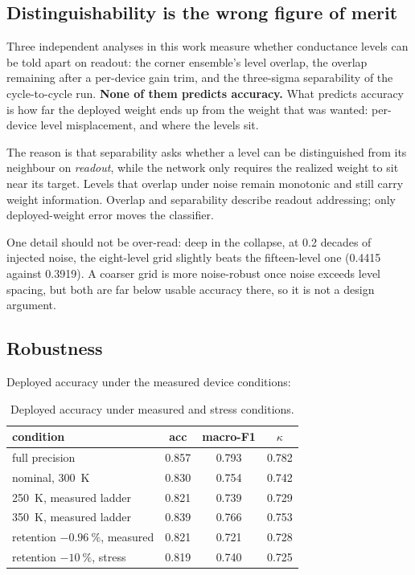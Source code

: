\subsection{Distinguishability is the wrong figure of merit}

Three independent analyses in this work measure whether conductance levels can be told
apart on readout: the corner ensemble's level overlap, the overlap remaining after a
per-device gain trim, and the three-sigma separability of the cycle-to-cycle run.
\textbf{None of them predicts accuracy.} What predicts accuracy is how far the deployed
weight ends up from the weight that was wanted: per-device level misplacement, and where
the levels sit.

The reason is that separability asks whether a level can be distinguished from its
neighbour on \emph{readout}, while the network only requires the realized weight to sit
near its target. Levels that overlap under noise remain monotonic and still carry weight
information. Overlap and separability describe readout addressing; only deployed-weight
error moves the classifier.

One detail should not be over-read: deep in the collapse, at \num{0.2} decades of injected
noise, the eight-level grid slightly beats the fifteen-level one (\num{0.4415} against
\num{0.3919}). A coarser grid is more noise-robust once noise exceeds level spacing, but
both are far below usable accuracy there, so it is not a design argument.

\subsection{Robustness}

Deployed accuracy under the measured device conditions:

\begin{table}[t]
\caption{Deployed accuracy under measured and stress conditions.}
\label{tab:robust}
\centering
\begin{tabular}{@{}lccc@{}}
\toprule
condition & acc & macro-F1 & $\kappa$ \\
\midrule
full precision & 0.857 & 0.793 & 0.782 \\
nominal, \SI{300}{\kelvin} & 0.830 & 0.754 & 0.742 \\
\SI{250}{\kelvin}, measured ladder & 0.821 & 0.739 & 0.729 \\
\SI{350}{\kelvin}, measured ladder & 0.839 & 0.766 & 0.753 \\
retention $-\SI{0.96}{\percent}$, measured & 0.821 & 0.721 & 0.728 \\
retention $-\SI{10}{\percent}$, stress & 0.819 & 0.740 & 0.725 \\
\bottomrule
\end{tabular}
\end{table}

